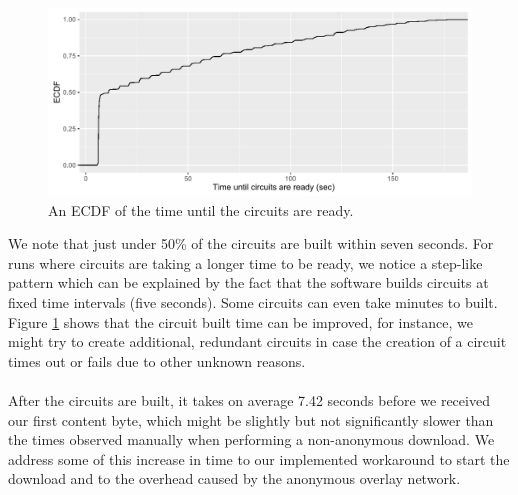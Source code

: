 \begin{figure}[!h]
	\centering
	\includegraphics[width=1.0\columnwidth]{images/big_experiment/circuits_ecdf}
	\caption{An ECDF of the time until the circuits are ready.}
	\label{fig:big-experiment-circuits}
\end{figure}

We note that just under 50\% of the circuits are built within seven seconds. For runs where circuits are taking a longer time to be ready, we notice a step-like pattern which can be explained by the fact that the software builds circuits at fixed time intervals (five seconds). Some circuits can even take minutes to built. Figure \ref{fig:big-experiment-circuits} shows that the circuit built time can be improved, for instance, we might try to create additional, redundant circuits in case the creation of a circuit times out or fails due to other unknown reasons.\\\\
After the circuits are built, it takes on average 7.42 seconds before we received our first content byte, which might be slightly but not significantly slower than the times observed manually when performing a non-anonymous download. We address some of this increase in time to our implemented workaround to start the download and to the overhead caused by the anonymous overlay network.

